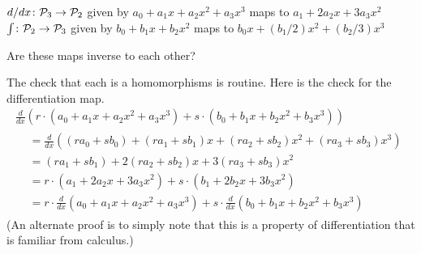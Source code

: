 \begin{exercises}
    \begin{exparts}
      \partsitem \( \mbox{$d/dx\colon \mathcal{P}_3\to \mathcal{P}_2$} \)
        given by \( a_0+a_1x+a_2x^2+a_3x^3 \) maps to
        \( a_1+2a_2x+3a_3x^2 \)
      \partsitem \( \mbox{$\int\colon \mathcal{P}_2\to \mathcal{P}_3$} \) given by
        \( b_0+b_1x+b_2x^2 \) maps to \( b_0x+(b_1/2)x^2+(b_2/3)x^3 \)
    \end{exparts}
    Are these maps inverse to each other?
    \begin{answer}
      The check that each is a homomorphisms is routine.
      Here is the check for the differentiation map.
      \begin{multline*}
        \frac{d}{dx}(r\cdot (a_0+a_1x+a_2x^2+a_3x^3)
                    +s\cdot (b_0+b_1x+b_2x^2+b_3x^3))                 \\
        \begin{aligned}
           &=\frac{d}{dx}((ra_0+sb_0)+(ra_1+sb_1)x+(ra_2+sb_2)x^2
                                                    +(ra_3+sb_3)x^3)  \\
           &=(ra_1+sb_1)+2(ra_2+sb_2)x+3(ra_3+sb_3)x^2         \\
           &=r\cdot (a_1+2a_2x+3a_3x^2)+s\cdot (b_1+2b_2x+3b_3x^2)         \\
           &=r\cdot \frac{d}{dx}(a_0+a_1x+a_2x^2+a_3x^3)
                    +s\cdot \frac{d}{dx} (b_0+b_1x+b_2x^2+b_3x^3)
        \end{aligned}
      \end{multline*}
      (An alternate proof is to simply note that this is a 
      property of differentiation that is familiar from calculus.)


\end{answer}
\end{exercises}
